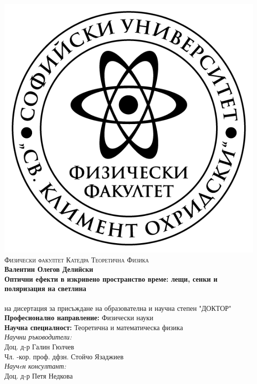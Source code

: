 \documentclass[12pt]{article}
\numberwithin{equation}{section}
\numberwithin{figure}{section}
\begin{document}
	
\thispagestyle{empty}
\begin{center}
	
	\centering
	\includegraphics[scale = 1]{Title_page/logo-FzF.png}
	\noindent\makebox[\linewidth]{\rule{15cm}{0.8pt}}
	\textsc{Физически факултет}
	\noindent\makebox[\linewidth]{\rule{15cm}{0.8pt}}
	\textsc{Катедра Теоретична	 Физика}\\
	\bigskip
	\bigskip
	\bigskip
	\bigskip
	{\Large{\textbf{Валентин Олегов Делийски}}}\\
	\bigskip
	\bigskip
	\bigskip
	{\Large \textbf{Оптични ефекти в изкривено пространство време: лещи, сенки и поляризация на светлина}}\\
	\bigskip
	\bigskip
	\bigskip
	{\textbf{\huge {}}}\\
	\bigskip
	на дисертация за присъждане на образователна и научна степен "ДОКТОР"\\
	\bigskip
	\bigskip
	\bigskip
	\textbf{Професионално направление:} Физически науки\\
	\textbf{Научна специалност:} Теоретична и математическа физика\\
	\bigskip
	\bigskip
	\bigskip
	\bigskip
	\textit{Научни ръководители:}\\
	Доц. д-р Галин Гюлчев\\
	\bigskip
	Чл. -кор. проф. дфзн. Стойчо Язаджиев\\
	\bigskip
	\textit{Научeн консултант:}\\
	Доц. д-р Петя Недкова\\
	
	\newpage
\end{center}
\end{document}
